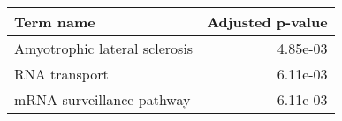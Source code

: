 \begin{tabular}{lr}
\toprule
                    Term name &  Adjusted p-value \\
\midrule
Amyotrophic lateral sclerosis &          4.85e-03 \\
                RNA transport &          6.11e-03 \\
    mRNA surveillance pathway &          6.11e-03 \\
\bottomrule
\end{tabular}

